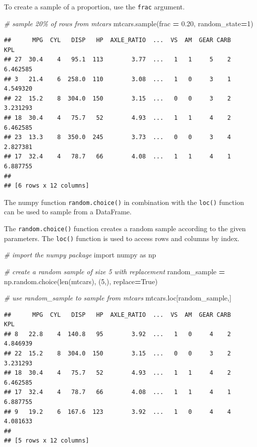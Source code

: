 \documentclass[
]{book}
\newenvironment{Shaded}{\begin{snugshade}}{\end{snugshade}}
\newcommand{\BuiltInTok}[1]{#1}
\newcommand{\CommentTok}[1]{\textcolor[rgb]{0.56,0.35,0.01}{\textit{#1}}}
\newcommand{\DecValTok}[1]{\textcolor[rgb]{0.00,0.00,0.81}{#1}}
\newcommand{\FloatTok}[1]{\textcolor[rgb]{0.00,0.00,0.81}{#1}}
\newcommand{\ImportTok}[1]{#1}
\newcommand{\NormalTok}[1]{#1}
\newcommand{\OperatorTok}[1]{\textcolor[rgb]{0.81,0.36,0.00}{\textbf{#1}}}
\newcommand{\VariableTok}[1]{\textcolor[rgb]{0.00,0.00,0.00}{#1}}
\begin{document}
To create a sample of a proportion, use the \texttt{frac} argument.

\begin{Shaded}
\begin{Highlighting}[]
\CommentTok{\# sample 20\% of rows from mtcars}
\NormalTok{mtcars.sample(frac }\OperatorTok{=} \FloatTok{0.20}\NormalTok{, random\_state}\OperatorTok{=}\DecValTok{1}\NormalTok{)}
\end{Highlighting}
\end{Shaded}

\begin{verbatim}
##      MPG  CYL   DISP   HP  AXLE_RATIO  ...  VS  AM  GEAR CARB       KPL
## 27  30.4    4   95.1  113        3.77  ...   1   1     5    2  6.462585
## 3   21.4    6  258.0  110        3.08  ...   1   0     3    1  4.549320
## 22  15.2    8  304.0  150        3.15  ...   0   0     3    2  3.231293
## 18  30.4    4   75.7   52        4.93  ...   1   1     4    2  6.462585
## 23  13.3    8  350.0  245        3.73  ...   0   0     3    4  2.827381
## 17  32.4    4   78.7   66        4.08  ...   1   1     4    1  6.887755
## 
## [6 rows x 12 columns]
\end{verbatim}

The numpy function \texttt{random.choice()} in combination with the \texttt{loc()} function can be used to sample from a DataFrame.

The \texttt{random.choice()} function creates a random sample according to the given parameters. The \texttt{loc()} function is used to access rows and columns by index.

\begin{Shaded}
\begin{Highlighting}[]
\CommentTok{\# import the numpy package}
\ImportTok{import}\NormalTok{ numpy }\ImportTok{as}\NormalTok{ np}

\CommentTok{\# create a random sample of size 5 with replacement}
\NormalTok{random\_sample }\OperatorTok{=}\NormalTok{ np.random.choice(}\BuiltInTok{len}\NormalTok{(mtcars), (}\DecValTok{5}\NormalTok{,), replace}\OperatorTok{=}\VariableTok{True}\NormalTok{)}

\CommentTok{\# use random\_sample to sample from mtcars}
\NormalTok{mtcars.loc[random\_sample,]}
\end{Highlighting}
\end{Shaded}

\begin{verbatim}
##      MPG  CYL   DISP   HP  AXLE_RATIO  ...  VS  AM  GEAR CARB       KPL
## 8   22.8    4  140.8   95        3.92  ...   1   0     4    2  4.846939
## 22  15.2    8  304.0  150        3.15  ...   0   0     3    2  3.231293
## 18  30.4    4   75.7   52        4.93  ...   1   1     4    2  6.462585
## 17  32.4    4   78.7   66        4.08  ...   1   1     4    1  6.887755
## 9   19.2    6  167.6  123        3.92  ...   1   0     4    4  4.081633
## 
## [5 rows x 12 columns]
\end{verbatim}
\end{document}
